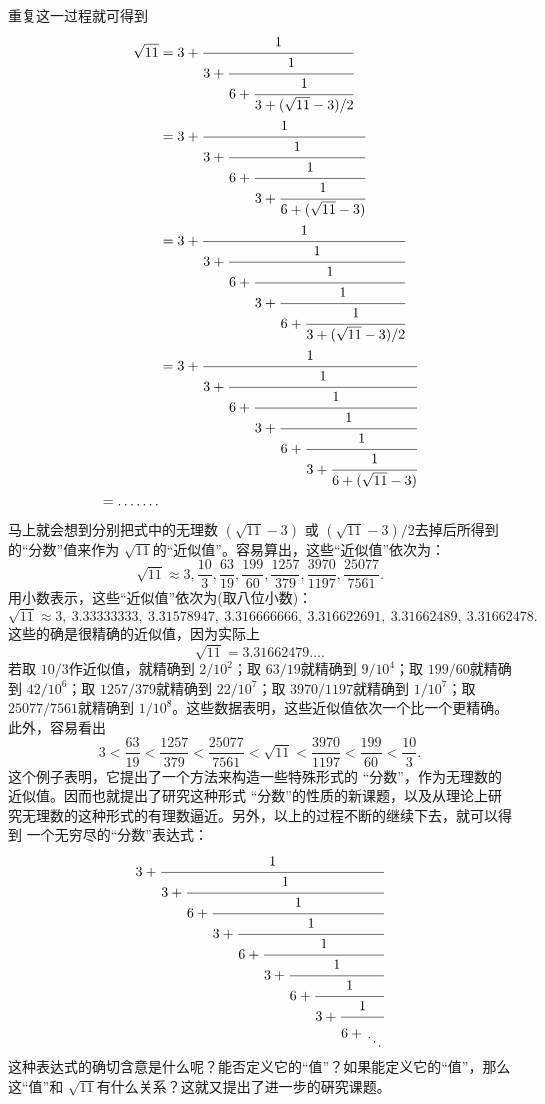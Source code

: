 \begin{example}
	重复这一过程就可得到
	\begin{align}
		\sqrt{11} & =
		3 + \cfrac{1}{3 +
			\cfrac{1}{6 +
				\cfrac{1}{3 +
					(\sqrt{11} -3)/2
		}}}          \label{cf5}  \\
		          & =
		3 + \cfrac{1}{3 +
			\cfrac{1}{6 +
				\cfrac{1}{3 +
					\cfrac{1}{6 +
						(\sqrt{11} -3)
		}}}}          \label{cf6} \\
		          & =
		3 + \cfrac{1}{3 +
			\cfrac{1}{6 +
				\cfrac{1}{3 +
					\cfrac{1}{6 +
						\cfrac{1}{3 +
							(\sqrt{11} -3) / 2
		}}}}}        \label{cf7}  \\
		          & =
		3 + \cfrac{1}{3 +
			\cfrac{1}{6 +
				\cfrac{1}{3 +
					\cfrac{1}{6 +
						\cfrac{1}{3 +
							\cfrac{1}{6 +
								(\sqrt{11} -3)
		}}}}}}        \label{cf8} \\
		= \dots\dots. \nonumber
	\end{align}
	马上就会想到分别把式中的无理数 \( (\sqrt{11} - 3) \) 或 \( (\sqrt{11} - 3)/2
	\)去掉后所得到的\enquote{分数}值来作为 \( \sqrt{11} \)的\enquote{近似值}。容易算出，这些\enquote{近似值}依次为：
	\begin{equation}\label{eq:根号11}
		\sqrt{11} \approx 3, \frac{10}{3}, \frac{63}{19}, \frac{199}{60}, \frac{1257}{379}, \frac{3970}{1197},
		\frac{25077}{7561}.
	\end{equation}
	用小数表示，这些\enquote{近似值}依次为(取八位小数)：
	\begin{equation}
		\sqrt{11} \approx 3,\: 3.33333333,\:3.31578947,\:3.316666666,\: 3.316622691,\: 3.31662489,\: 3.31662478.
	\end{equation}
	这些的确是很精确的近似值，因为实际上
	\begin{equation}
		\sqrt{11} = 3.31662479\dots.
	\end{equation}
	若取 \( 10 / 3 \)作近似值，就精确到 \( 2 / 10^2 \)；取 \( 63 / 19 \)就精确到 \( 9 / 10^4 \)；取 \( 199 / 60 \)就精确到
	\( 42 / 10^6 \)；取 \( 1257 / 379 \)就精确到 \( 22 / 10^7 \)；取 \( 3970 / 1197 \)就精确到 \( 1 / 10^7 \)；取 \( 25077 /
	7561\)就精确到 \( 1/10^8 \)。这些数据表明，这些近似值依次一个比一个更精确。此外，容易看出
	\begin{equation}
		3 < \frac{63}{19} < \frac{1257}{379} < \frac{25077}{7561} < \sqrt{11} < \frac{3970}{1197} < \frac{199}{60} <
		\frac{10}{3}.
	\end{equation}
	这个例子表明，它提出了一个方法来构造一些特殊形式的 \enquote{分数}，作为无理数的近似值。因而也就提出了研究这种形式
	\enquote{分数}的性质的新课题，以及从理论上研究无理数的这种形式的有理数逼近。另外，以上的过程不断的继续下去，就可以得到
	一个无穷尽的\enquote{分数}表达式：
	\begin{equation}
		3 + \cfrac{1}{3 +
			\cfrac{1}{6 +
				\cfrac{1}{3 +
					\cfrac{1}{6 +
						\cfrac{1}{3 +
							\cfrac{1}{6 +
								\cfrac{1}{3 +
									\cfrac{1}{6 +
										\genfrac{}{}{0pt}{}{\phantom{1}}{\ddots}
									}}}}}}}}
	\end{equation}
	这种表达式的确切含意是什么呢？能否定义它的\enquote{值}？如果能定义它的\enquote{值}，那么这\enquote{值}和 \( \sqrt{11}
	\)有什么关系？这就又提出了进一步的硏究课题。
\end{example}

